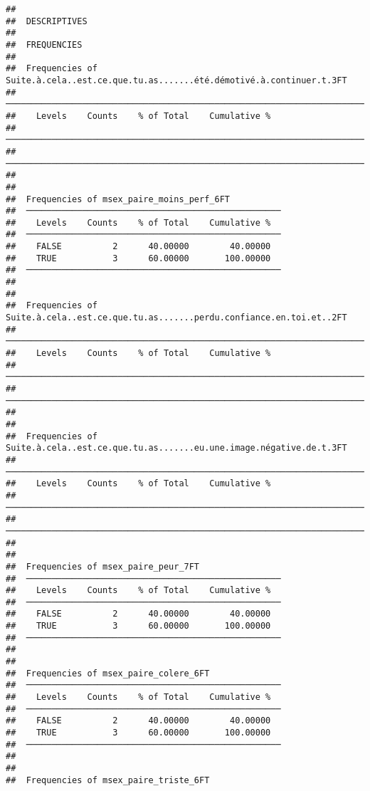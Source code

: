 \documentclass[
]{article}
\begin{document}
\begin{verbatim}
## 
##  DESCRIPTIVES
## 
##  FREQUENCIES
## 
##  Frequencies of Suite.à.cela..est.ce.que.tu.as.......été.démotivé.à.continuer.t.3FT 
##  ────────────────────────────────────────────────────────────────────────────────── 
##    Levels    Counts    % of Total    Cumulative %   
##  ────────────────────────────────────────────────────────────────────────────────── 
##  ────────────────────────────────────────────────────────────────────────────────── 
## 
## 
##  Frequencies of msex_paire_moins_perf_6FT           
##  ────────────────────────────────────────────────── 
##    Levels    Counts    % of Total    Cumulative %   
##  ────────────────────────────────────────────────── 
##    FALSE          2      40.00000        40.00000   
##    TRUE           3      60.00000       100.00000   
##  ────────────────────────────────────────────────── 
## 
## 
##  Frequencies of Suite.à.cela..est.ce.que.tu.as.......perdu.confiance.en.toi.et..2FT 
##  ────────────────────────────────────────────────────────────────────────────────── 
##    Levels    Counts    % of Total    Cumulative %   
##  ────────────────────────────────────────────────────────────────────────────────── 
##  ────────────────────────────────────────────────────────────────────────────────── 
## 
## 
##  Frequencies of Suite.à.cela..est.ce.que.tu.as.......eu.une.image.négative.de.t.3FT 
##  ────────────────────────────────────────────────────────────────────────────────── 
##    Levels    Counts    % of Total    Cumulative %   
##  ────────────────────────────────────────────────────────────────────────────────── 
##  ────────────────────────────────────────────────────────────────────────────────── 
## 
## 
##  Frequencies of msex_paire_peur_7FT                 
##  ────────────────────────────────────────────────── 
##    Levels    Counts    % of Total    Cumulative %   
##  ────────────────────────────────────────────────── 
##    FALSE          2      40.00000        40.00000   
##    TRUE           3      60.00000       100.00000   
##  ────────────────────────────────────────────────── 
## 
## 
##  Frequencies of msex_paire_colere_6FT               
##  ────────────────────────────────────────────────── 
##    Levels    Counts    % of Total    Cumulative %   
##  ────────────────────────────────────────────────── 
##    FALSE          2      40.00000        40.00000   
##    TRUE           3      60.00000       100.00000   
##  ────────────────────────────────────────────────── 
## 
## 
##  Frequencies of msex_paire_triste_6FT               

\end{verbatim}
\end{document}
